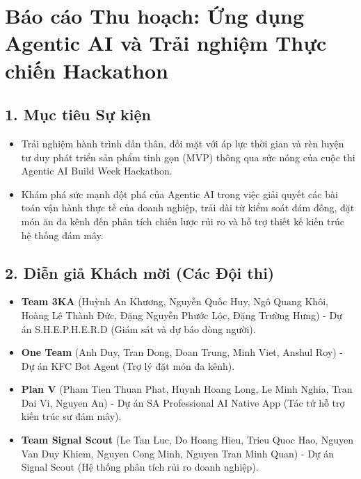 \hypertarget{buxe1o-cuxe1o-thu-houx1ea1ch-ux1ee9ng-dux1ee5ng-agentic-ai-vuxe0-trux1ea3i-nghiux1ec7m-thux1ef1c-chiux1ebfn-hackathon}{%
\section{Báo cáo Thu hoạch: Ứng dụng Agentic AI và Trải nghiệm Thực
chiến
Hackathon}}

\hypertarget{mux1ee5c-tiuxeau-sux1ef1-kiux1ec7n}{%
\subsection{1. Mục tiêu Sự
kiện}}

\begin{itemize}
\tightlist
\item
  Trải nghiệm hành trình dấn thân, đối mặt với áp lực thời gian và rèn
  luyện tư duy phát triển sản phẩm tinh gọn (MVP) thông qua sức nóng của
  cuộc thi Agentic AI Build Week Hackathon.
\item
  Khám phá sức mạnh đột phá của Agentic AI trong việc giải quyết các bài
  toán vận hành thực tế của doanh nghiệp, trải dài từ kiểm soát đám
  đông, đặt món ăn đa kênh đến phân tích chiến lược rủi ro và hỗ trợ
  thiết kế kiến trúc hệ thống đám mây.
\end{itemize}

\hypertarget{diux1ec5n-giux1ea3-khuxe1ch-mux1eddi-cuxe1c-ux111ux1ed9i-thi}{%
\subsection{2. Diễn giả Khách mời (Các Đội
thi)}}

\begin{itemize}
\tightlist
\item
  \textbf{Team 3KA} (Huỳnh An Khương, Nguyễn Quốc Huy, Ngô Quang Khôi,
  Hoàng Lê Thành Đức, Đặng Nguyễn Phước Lộc, Đặng Trường Hưng) - Dự án
  S.H.E.P.H.E.R.D (Giám sát và dự báo dòng người).
\item
  \textbf{One Team} (Anh Duy, Tran Dong, Doan Trung, Minh Viet, Anshul
  Roy) - Dự án KFC Bot Agent (Trợ lý đặt món đa kênh).
\item
  \textbf{Plan V} (Pham Tien Thuan Phat, Huynh Hoang Long, Le Minh
  Nghia, Tran Dai Vi, Nguyen An) - Dự án SA Professional AI Native App
  (Tác tử hỗ trợ kiến trúc sư đám mây).
\item
  \textbf{Team Signal Scout} (Le Tan Luc, Do Hoang Hieu, Trieu Quoc Hao,
  Nguyen Van Duy Khiem, Nguyen Cong Minh, Nguyen Tran Minh Quan) - Dự án
  Signal Scout (Hệ thống phân tích rủi ro doanh nghiệp).
\end{itemize}

